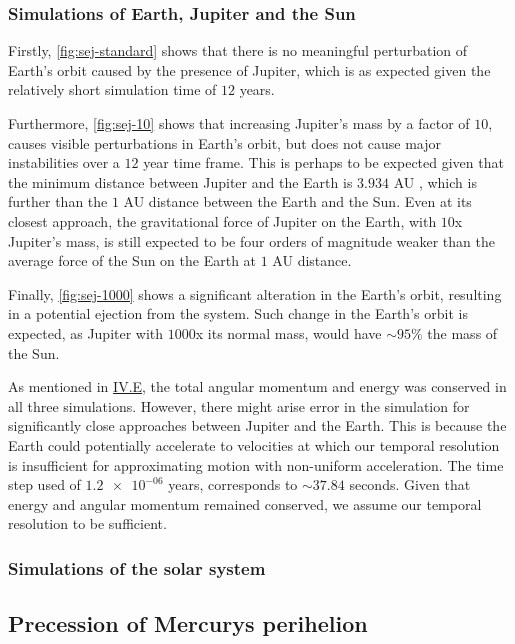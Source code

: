 \documentclass[reprint,english,notitlepage]{revtex4-1}  %
\begin{document}
\subsubsection{Simulations of Earth, Jupiter and the Sun} \label{sec:V:c:i}
Firstly, \ref{fig:sej-standard} shows that there is no meaningful perturbation of Earth's orbit caused by the presence of Jupiter, which is as expected given the relatively short simulation time of \(12\) years.

Furthermore, \ref{fig:sej-10} shows that increasing Jupiter's mass by a factor of \(10\), causes visible perturbations in Earth's orbit, but does not cause major instabilities over a \(12\) year time frame. This is perhaps to be expected given that the minimum distance between Jupiter and the Earth is \(3.934\) AU \citep{NASA2014}, which is further than the \(1\) AU distance between the Earth and the Sun. Even at its closest approach, the gravitational force of Jupiter on the Earth, with \(10\)x Jupiter's mass, is still expected to be four orders of magnitude weaker than the average force of the Sun on the Earth at \(1\) AU distance.

Finally, \ref{fig:sej-1000} shows a significant alteration in the Earth's orbit, resulting in a potential ejection from the system. Such change in the Earth's orbit is expected, as Jupiter with \(1000\)x its normal mass, would have \(\sim 95\%\) the mass of the Sun.

As mentioned in \hyperref[sec:IV:e]{IV.E}, the total angular momentum and energy was conserved in all three simulations. However, there might arise error in the simulation for significantly close approaches between Jupiter and the Earth. This is because the Earth could potentially accelerate to velocities at which our temporal resolution is insufficient for approximating motion with non-uniform acceleration. The time step used of \(\num{1.2e-06}\) years, corresponds to \(\sim 37.84\) seconds. Given that energy and angular momentum remained conserved, we assume our temporal resolution to be sufficient.

\subsubsection{Simulations of the solar system} \label{sec:V:c:ii}

\subsection{Precession of Mercurys perihelion} \label{sec:V:d}
\end{document}
